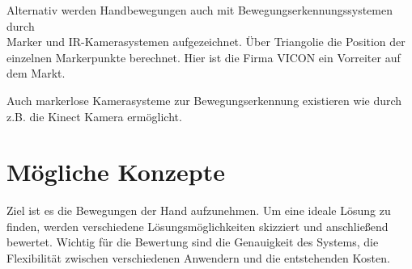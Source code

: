 \documentclass[a4paper,12pt,final]{article} %
\numberwithin{equation}{section} %
\numberwithin{figure}{section} %
\numberwithin{table}{section} %
\begin{document}
Alternativ werden Handbewegungen auch mit Bewe\-gungs\-er\-kenn\-ungs\-sys\-temen durch\\ Marker und IR-Kamera\-systemen aufgezeichnet. Über Triangolie die Position der ein\-zel\-nen Markerpunkte berechnet. Hier ist die Firma VICON ein Vorreiter auf dem Markt.

Auch markerlose Kamerasysteme zur Bewegungserkennung existieren wie durch z.B. die Kinect Kamera ermöglicht.


\newpage
\section{Mögliche Konzepte}
Ziel ist es die Bewegungen der Hand aufzunehmen.
Um eine ideale Lösung zu finden, werden verschiedene Lösungsmöglichkeiten skizziert und anschließend bewertet.
Wichtig für die Bewertung sind die Genauigkeit des Systems, die Flexibilität zwischen ver\-schie\-den\-en Anwendern und die entstehenden Kosten. 
\end{document}
